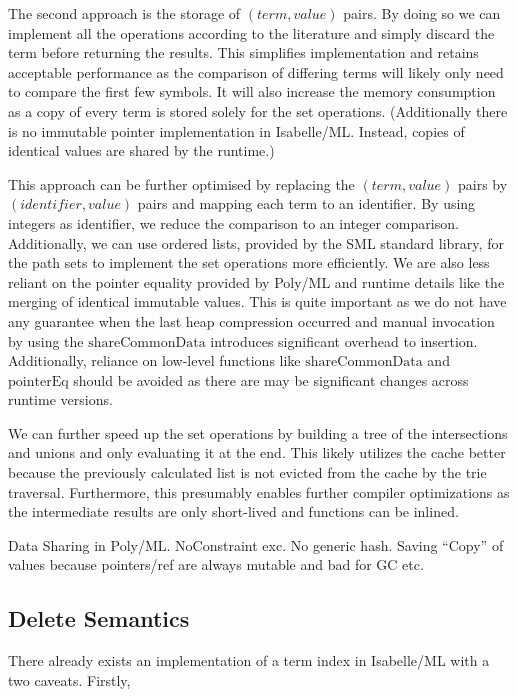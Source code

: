 The second approach is the storage of $(term, value)$ pairs. By doing so we can implement all the operations according to the literature and simply discard the term before returning the results. This simplifies implementation and retains acceptable performance as the comparison of differing terms will likely only need to compare the first few symbols. It will also increase the memory consumption as a copy of every term is stored solely for the set operations. (Additionally there is no immutable pointer implementation in Isabelle/ML. Instead, copies of identical values are shared by the runtime.)

This approach can be further optimised by replacing the $(term, value)$ pairs by $(identifier, value)$ pairs and mapping each term to an identifier. By using integers as identifier, we reduce the comparison to an integer comparison. Additionally, we can use ordered lists, provided by the SML standard library, for the path sets to implement the set operations more efficiently. We are also less reliant on the pointer equality provided by Poly/ML and runtime details like the merging of identical immutable values. This is quite important as we do not have any guarantee when the last heap compression occurred and manual invocation by using the $\mathrm{shareCommonData}$ introduces significant overhead to insertion. Additionally, reliance on low-level functions like $\mathrm{shareCommonData}$ and $\mathrm{pointerEq}$ should be avoided as there are may be significant changes across runtime versions.

We can further speed up the set operations by building a tree of the intersections and unions and only evaluating it at the end. This likely utilizes the cache better because the previously calculated list is not evicted from the cache by the trie traversal. Furthermore, this presumably enables further compiler optimizations as the intermediate results are only short-lived and functions can be inlined. 

Data Sharing in Poly/ML. NoConstraint exc. No generic hash. Saving ``Copy'' of values because pointers/ref are always mutable and bad for GC etc.

\subsection{Delete Semantics}
There already exists an implementation of a term index in Isabelle/ML with a two caveats. Firstly,
